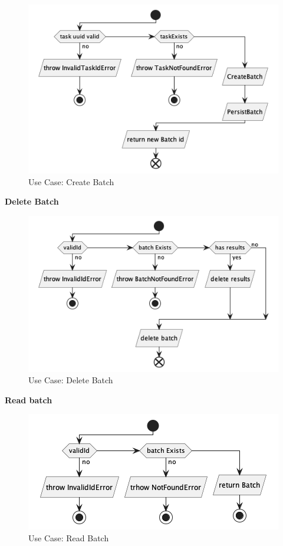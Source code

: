 \begin{figure}[H]
    \centering
    \includegraphics[height=0.2\textheight]{./part/Proyecto_ejecutivo/memoria_descriptiva/descripcionDelProyecto/manager/uml/createBatchUseCase}
    \caption{Use Case: Create Batch}\label{fig:Use Case: Create Batch}
\end{figure}

\textbf{Delete Batch}

\begin{figure}[H]
    \centering
    \includegraphics[height=0.2\textheight]{./part/Proyecto_ejecutivo/memoria_descriptiva/descripcionDelProyecto/manager/uml/deleteBatchUseCase}
    \caption{Use Case: Delete Batch}\label{fig:Use Case: Delete Batch}
\end{figure}

\textbf{Read batch}

\begin{figure}[H]
    \centering
    \includegraphics[height=0.2\textheight]{./part/Proyecto_ejecutivo/memoria_descriptiva/descripcionDelProyecto/manager/uml/getBatchUseCase}
    \caption{Use Case: Read Batch}\label{fig:Use Case: Read Batch}
\end{figure}

